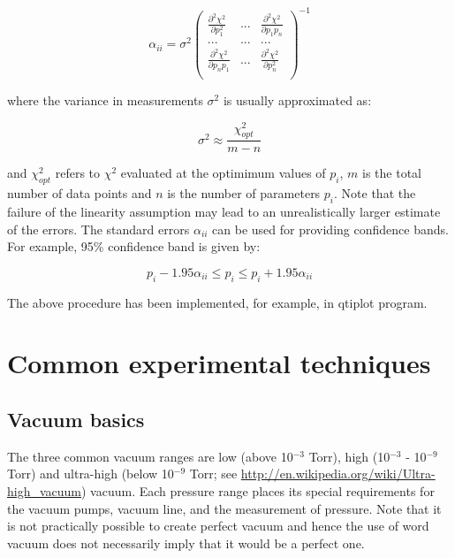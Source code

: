 \documentclass[byrevtex,amssymb,aps,pra,floatfix,letterpaper]{revtex4}
\begin{document}
\begin{equation}
\label{eq22}
\alpha_{ii} = \sigma^2\left(
\begin{array}{ccc}
\frac{\partial^2 \chi^2}{\partial p_1^2} & ... & \frac{\partial^2 \chi^2}{\partial p_1p_n}\\
... & ... & ...\\
\frac{\partial^2 \chi^2}{\partial p_np_1} & ... & \frac{\partial^2 \chi^2}{\partial p_n^2}\\
\end{array}
\right)^{-1}
\end{equation}

\noindent
where the variance in measurements $\sigma^2$ is usually approximated as:

\begin{equation}
\label{eq22a}
\sigma^2 \approx \frac{\chi^2_{opt}}{m-n}
\end{equation}

\noindent
and $\chi^2_{opt}$ refers to $\chi^2$ evaluated at the optimimum values of $p_i$, $m$ is the total number of data points and $n$ is the number of parameters $p_i$. Note that the failure of the linearity assumption may lead to an unrealistically larger estimate of the errors. The standard errors $\alpha_{ii}$ can be used for providing confidence bands. For example, 95\% confidence band is given by:

\begin{equation}
\label{eq22b}
p_i - 1.95\alpha_{ii} \le p_i \le p_i + 1.95\alpha_{ii}
\end{equation}

\noindent
The above procedure has been implemented, for example, in qtiplot program.

\section{Common experimental techniques}
\label{sec8}

\subsection{Vacuum basics}

The three common vacuum ranges are low (above 10$^{-3}$ Torr), high (10$^{-3}$ - 10$^{-9}$ Torr) and ultra-high (below 10$^{-9}$ Torr; see \url{http://en.wikipedia.org/wiki/Ultra-high_vacuum}) vacuum. Each pressure range places its special requirements for the vacuum pumps, vacuum line, and the measurement of pressure. Note that it is not practically possible to create perfect vacuum and hence the use of word vacuum does not necessarily imply that it would be a perfect one.
\end{document}
